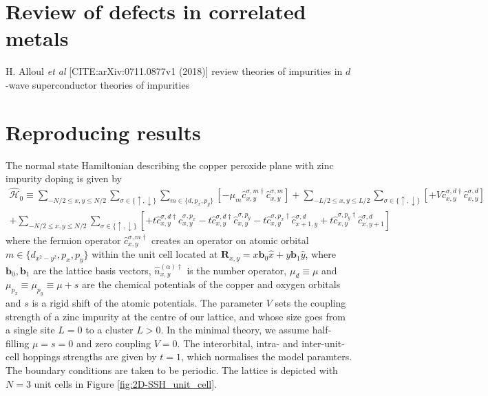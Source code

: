 \section{Review of defects in correlated metals}
H. Alloul {\it et al} [CITE:arXiv:0711.0877v1 (2018)] review theories of impurities in $d$-wave superconductor theories of impurities 


\section{Reproducing results}
The normal state Hamiltonian describing the copper peroxide plane with zinc impurity doping is given by
\begin{multline}
    \hat{\mathcal{H}}_{ 0 } \equiv
        \sum_{-N/2\leq x,y\leq N/2}\sum_{\sigma\in\{\uparrow,\downarrow\}}\sum_{m\in\{d, p_x, p_y\}}\left[
            -\mu_m \hat{c}^{ \sigma,m \dagger}_{ x,y }\hat{c}^{ \sigma,m }_{ x,y }
        \right]
            + \sum_{-L/2\leq x,y\leq L/2}\sum_{\sigma\in\{\uparrow,\downarrow\}} \left[+V\hat{c}^{ \sigma,d \dagger}_{ x,y }\hat{c}^{ \sigma,d }_{ x,y }\right]
            \\
        +\sum_{-N/2\leq x,y\leq N/2}\sum_{\sigma\in\{\uparrow,\downarrow\}}\left[
            +t \hat{c}^{ \sigma,d \dagger}_{ x,y }\hat{c}^{ \sigma,p_x }_{ x,y }
            -t \hat{c}^{ \sigma,d \dagger}_{ x,y }\hat{c}^{ \sigma,p_y }_{ x,y }
            -t \hat{c}^{ \sigma, p_x \dagger}_{ x,y }\hat{c}^{ \sigma,d }_{ x+1,y }
            +t \hat{c}^{ \sigma,p_y \dagger}_{ x,y }\hat{c}^{ \sigma,d }_{ x,y+1 }
        \right]
\end{multline}
where the fermion operator $\hat{c}^{\sigma,m\dagger}_{ x,y }$ creates an operator on atomic orbital $m\in\{d_{x^2-y^2},p_x,p_y\}$ within the unit cell located at $\mathbf{R}_{x,y}= x \mathbf{b}_0\hat{x}+y \mathbf{b}_1 \hat{y}$,
where $\mathbf{b}_0, \mathbf{b}_1$ are the lattice basis vectors,
$\hat{n}^{(\alpha)\dagger}_{ x,y }$ is the number operator, $\mu_d\equiv\mu$ and $\mu_{p_x}\equiv\mu_{p_y}\equiv\mu+s$ are the chemical potentials of the copper and oxygen orbitals and $s$ is a rigid shift of the atomic potentials.
The parameter $V$ sets the coupling strength of a zinc impurity at the centre of our lattice, and whose size goes from a single site $L=0$ to a cluster $L>0$.
In the minimal theory, we assume half-filling $\mu=s=0$ and zero coupling $V=0$.
The interorbital, intra- and inter-unit-cell hoppings strengths are given by $t=1$, which normalises the model paramters.
The boundary conditions are taken to be periodic.
The lattice is depicted with $N=3$ unit cells in Figure \ref{fig:2D-SSH_unit_cell}. 

